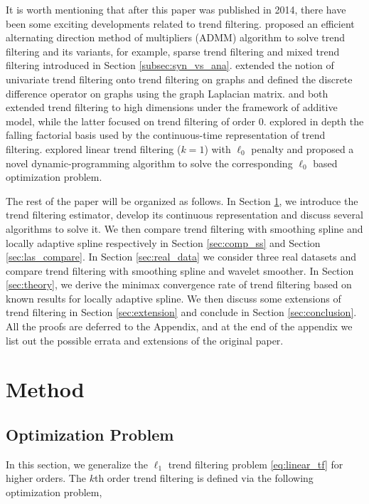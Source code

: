 \documentclass[a4paper]{article}
\begin{document}
It is worth mentioning that after this paper was published in 2014, there have been some exciting developments related to trend filtering. \cite{ramdas2016fast} proposed an efficient alternating direction method of multipliers (ADMM) algorithm to solve trend filtering and its variants, for example, sparse trend filtering and mixed trend filtering introduced in Section \ref{subsec:syn_vs_ana}. \cite{wang2016trend} extended the notion of univariate trend filtering onto trend filtering on graphs and defined the discrete difference operator on graphs using the graph Laplacian matrix. \cite{sadhanala2017additive} and \cite{petersen2016fused} both extended trend filtering to high dimensions under the framework of additive model, while the latter focused on trend filtering of order $0$. \cite{wang2014falling} explored in depth the falling factorial basis used by the continuous-time representation of trend filtering. \cite{maidstone2017detecting} explored linear trend filtering ($k =1$) with $\ell_0$ penalty and proposed a novel dynamic-programming algorithm to solve the corresponding $\ell_0$ based optimization problem. 

The rest of the paper will be organized as follows. In Section \ref{sec:method}, we introduce the trend filtering estimator, develop its continuous representation and discuss several algorithms to solve it. We then compare trend filtering with smoothing spline and locally adaptive spline respectively in Section \ref{sec:comp_ss} and Section \ref{sec:las_compare}. In Section \ref{sec:real_data}  we consider three real datasets and compare trend filtering with smoothing spline and wavelet smoother. In Section \ref{sec:theory}, we derive the minimax convergence rate of trend filtering based on known results for locally adaptive spline. We then discuss some extensions of trend filtering in Section \ref{sec:extension} and conclude in Section \ref{sec:conclusion}. All the proofs are deferred to the Appendix, and at the end of the appendix we list out the possible errata and extensions of the original paper.


\section{Method}
\label{sec:method}

\subsection{Optimization Problem}
\label{subsec:opt_problem}
In this section, we generalize the $\ell_1$ trend filtering problem \eqref{eq:linear_tf} for higher orders. The $k$th order trend filtering is defined via the following optimization problem,
\end{document}
